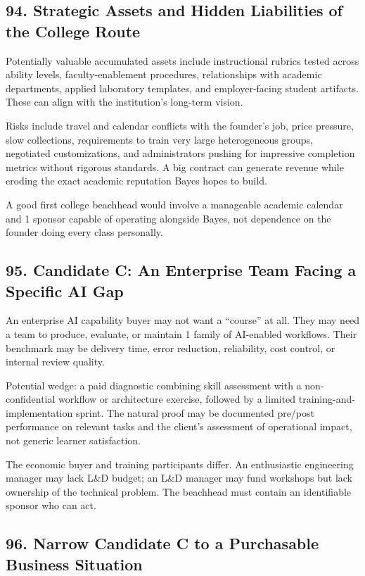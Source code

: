 \subsection*{94. Strategic Assets and Hidden Liabilities of the College Route}

Potentially valuable accumulated assets include instructional rubrics tested across ability levels, faculty-enablement procedures, relationships with academic departments, applied laboratory templates, and employer-facing student artifacts. These can align with the institution's long-term vision.

Risks include travel and calendar conflicts with the founder's job, price pressure, slow collections, requirements to train very large heterogeneous groups, negotiated customizations, and administrators pushing for impressive completion metrics without rigorous standards. A big contract can generate revenue while eroding the exact academic reputation Bayes hopes to build.

A good first college beachhead would involve a manageable academic calendar and 1 sponsor capable of operating alongside Bayes, not dependence on the founder doing every class personally.

\subsection*{95. Candidate C: An Enterprise Team Facing a Specific AI Gap}

An enterprise AI capability buyer may not want a ``course'' at all. They may need a team to produce, evaluate, or maintain 1 family of AI-enabled workflows. Their benchmark may be delivery time, error reduction, reliability, cost control, or internal review quality.

Potential wedge: a paid diagnostic combining skill assessment with a non-confidential workflow or architecture exercise, followed by a limited training-and-implementation sprint. The natural proof may be documented pre/post performance on relevant tasks and the client's assessment of operational impact, not generic learner satisfaction.

The economic buyer and training participants differ. An enthusiastic engineering manager may lack L\&D budget; an L\&D manager may fund workshops but lack ownership of the technical problem. The beachhead must contain an identifiable sponsor who can act.

\subsection*{96. Narrow Candidate C to a Purchasable Business Situation}

